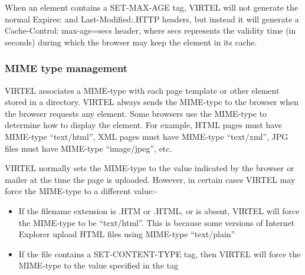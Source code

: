 \documentclass[letterpaper,10pt,english]{sphinxmanual}
\begin{document}

\begin{sphinxVerbatim}[commandchars=\\\{\}]
   
\end{sphinxVerbatim}

When an element contains a SET-MAX-AGE tag, VIRTEL will not generate the normal Expires: and Last-Modified:.HTTP headers, but instead it will generate a Cache-Control: max-age=secs header, where secs represents the validity time (in seconds) during which the browser may keep the element in its cache.


\subsubsection{MIME type management}
\label{\detokenize{User_Guide:mime-type-management}}

VIRTEL associates a MIME-type with each page template or other element stored in a directory. VIRTEL always sends the MIME-type to the browser when the browser requests any element. Some browsers use the MIME-type to determine how to display the element. For example, HTML pages must have MIME-type “text/html”, XML pages must have MIME-type “text/xml”, JPG files must have MIME-type “image/jpeg”, etc.

VIRTEL normally sets the MIME-type to the value indicated by the browser or mailer at the time the page is uploaded. However, in certain cases VIRTEL may force the MIME-type to a different value:-
\begin{itemize}
\item {} 
If the filename extension is .HTM or .HTML, or is absent, VIRTEL will force the MIME-type to be “text/html”. This is because some versions of Internet Explorer upload HTML files using MIME-type “text/plain”

\item {} 
If the file contains a SET-CONTENT-TYPE tag, then VIRTEL will force the MIME-type to the value specified in the tag

\end{itemize}

\end{document}
